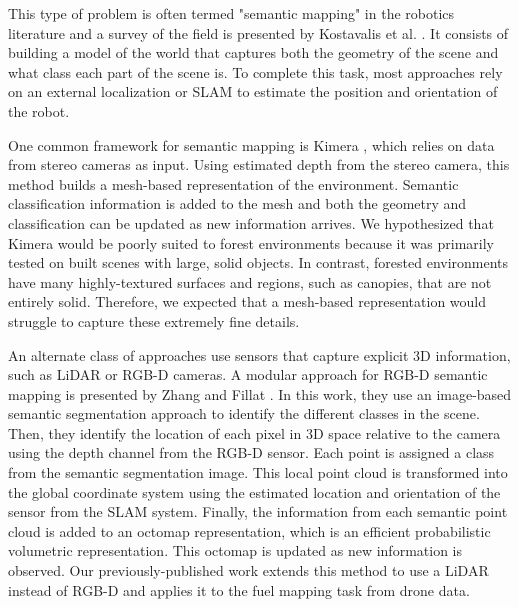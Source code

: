 This type of problem is often termed "semantic mapping" in the robotics literature and a survey of the field is presented by Kostavalis et al. \cite{Kostavelis2015SemanticSurvey}. It consists of building a model of the world that captures both the geometry of the scene and what class each part of the scene is. To complete this task, most approaches rely on an external localization or SLAM to estimate the position and orientation of the robot.

One common framework for semantic mapping is Kimera \cite{Rosinol2020}, which relies on data from stereo cameras as input. Using estimated depth from the stereo camera, this method builds a mesh-based representation of the environment. Semantic classification information is added to the mesh and both the geometry and classification can be updated as new information arrives. We hypothesized that Kimera would be poorly suited to forest environments because it was primarily tested on built scenes with large, solid objects. In contrast, forested environments have many highly-textured surfaces and regions, such as canopies, that are not entirely solid. Therefore, we expected that a mesh-based representation would struggle to capture these extremely fine details.

An alternate class of approaches use sensors that capture explicit 3D information, such as LiDAR or RGB-D cameras. A modular approach for RGB-D semantic mapping is presented by Zhang and Fillat \cite{semantic_slam_RGBD}. In this work, they use an image-based semantic segmentation approach to identify the different classes in the scene. Then, they identify the location of each pixel in 3D space relative to the camera using the depth channel from the RGB-D sensor. Each point is assigned a class from the semantic segmentation image. This local point cloud is transformed into the global coordinate system using the estimated location and orientation of the sensor from the SLAM system. Finally, the information from each semantic point cloud is added to an octomap \cite{hornung13auro} representation, which is an efficient probabilistic volumetric representation.  This octomap is updated as new information is observed. Our previously-published work \cite{RussellUnmannedMitigation} extends this method to use a LiDAR instead of RGB-D and applies it to the fuel mapping task from drone data.


